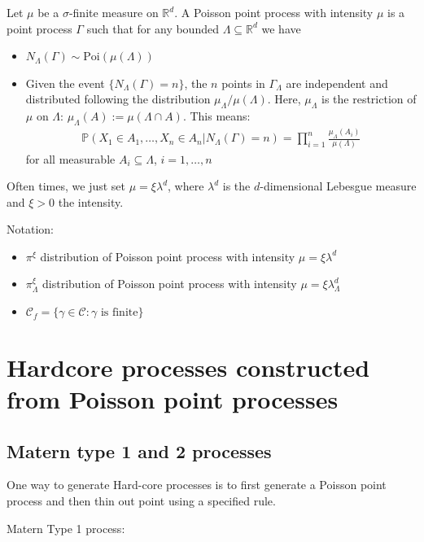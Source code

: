 Let $\mu$ be a $\sigma$-finite measure on $\mathbb{R}^d$. A Poisson point process with intensity $\mu$ is a point process $\Gamma$ such that for any bounded $\Lambda\subseteq\mathbb{R}^d$ we have
\begin{itemize}
    \item $N_{\Lambda}(\Gamma)\sim\text{Poi}(\mu(\Lambda))$
    \item Given the event $\{N_{\Lambda}(\Gamma)=n\}$, the $n$ points in $\Gamma_{\Lambda}$ are independent and distributed following the distribution $\mu_{\Lambda}/\mu(\Lambda)$. Here, $\mu_{\Lambda}$ is the restriction of $\mu$ on $\Lambda$: $\mu_{\Lambda}(A):=\mu(\Lambda\cap A)$. This means:
    \begin{align*}
        \mathbb{P}(X_1\in A_1,\dots,X_n\in A_n|N_{\Lambda}(\Gamma)=n)=\prod_{i=1}^{n}\frac{\mu_{\Lambda}(A_i)}{\mu(\Lambda)}
    \end{align*}
    for all measurable $A_i\subseteq\Lambda$, $i=1,\dots,n$
\end{itemize}

Often times, we just set $\mu=\xi\lambda^d$, where $\lambda^d$ is the $d$-dimensional Lebesgue measure and $\xi>0$ the intensity.

Notation:
\begin{itemize}
    \item $\pi^{\xi}$ distribution of Poisson point process with intensity $\mu=\xi\lambda^d$
    \item $\pi^{\xi}_{\Lambda}$ distribution of Poisson point process with intensity $\mu=\xi\lambda^d_{\Lambda}$ 
    \item $\mathcal{C}_f=\{\gamma\in\mathcal{C}:\gamma\text{ is finite}\}$
\end{itemize}

\section{Hardcore processes constructed from Poisson point processes}\label{sec:hardcore_from_ppp}

\subsection{Matern type 1 and 2 processes}

One way to generate Hard-core processes is to first generate a Poisson point process and then thin out point using a specified rule. 

Matern Type 1 process:

